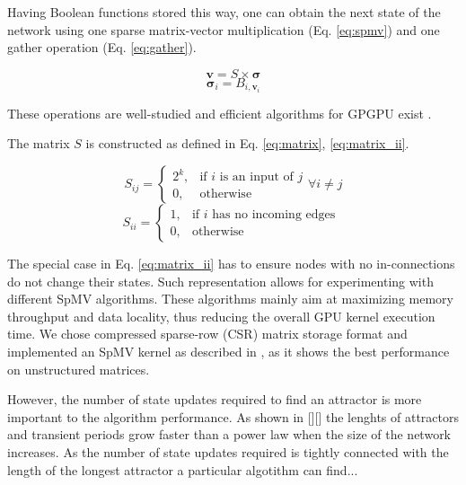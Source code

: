 \documentclass[procedia]{easychair}
\begin{document}
	Having Boolean functions stored this way, one can obtain the next state of the network using one sparse matrix-vector multiplication (Eq. \ref{eq:spmv}) and one gather operation (Eq. \ref{eq:gather}).
	
	\begin{equation}
	\label{eq:spmv}
		\mathbf{v} = S \times \boldsymbol{\sigma}
	\end{equation}
	\begin{equation}
	\label{eq:gather}
		\boldsymbol{\sigma}_i = B_{i, \mathbf{v}_i}
	\end{equation}
	
	These operations are well-studied and efficient algorithms for GPGPU exist \cite{bell2008efficient}\cite{he2007efficient}.
	
	The matrix \(S\) is constructed as defined in Eq. \ref{eq:matrix}, \ref{eq:matrix_ii}. 
	
	\begin{equation}
		\label{eq:matrix}
		S_{ij} = \begin{cases}
			2^k, & \mbox{if } i\mbox{ is an input of } j \\
			0, & \mbox{otherwise}
		\end{cases} \forall i \neq j
	\end{equation}
	\begin{equation}
	\label{eq:matrix_ii}
	S_{ii} = \begin{cases}
		1, & \mbox{if } i\mbox{ has no incoming edges }\\
		0, & \mbox{otherwise}
		\end{cases}
	\end{equation}
	
	The special case in Eq. \ref{eq:matrix_ii} has to ensure nodes with no in-connections do not change their states. Such representation allows for experimenting with different SpMV algorithms. These algorithms mainly aim at maximizing memory throughput and data locality, thus reducing the overall GPU kernel execution time. We chose compressed sparse-row (CSR) matrix storage format and implemented an SpMV kernel as described in \cite{bell2008efficient}, as it shows the best performance on unstructured matrices.
	
	However, the number of state updates required to find an attractor is more important to the algorithm performance. As shown in [][] the lenghts of attractors and transient periods grow faster than a power law when the size of the network increases. As the number of state updates required is tightly connected with the length of the longest attractor a particular algotithm can find...
	
\end{document}
